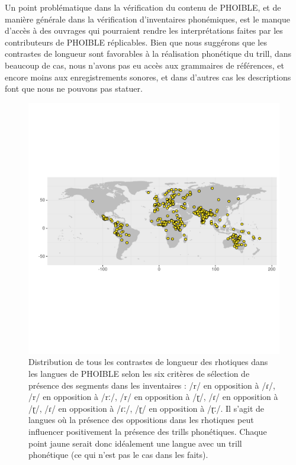 Un point problématique dans la vérification du contenu de PHOIBLE, et de manière générale dans la vérification d'inventaires phonémiques, est le manque d'accès à des ouvrages qui pourraient rendre les interprétations faites par les contributeurs de PHOIBLE réplicables. Bien que nous suggérons que les contrastes de longueur sont favorables à la réalisation phonétique du trill, dans beaucoup de cas, nous n'avons pas eu accès aux grammaires de références, et encore moins aux enregistrements sonores, et dans d'autres cas les descriptions font que nous ne pouvons pas statuer.\\

\begin{figure}
	\centering
	\includegraphics[width=1\linewidth,
	trim={0 5.65cm 0 5.25cm}, clip]{substance/images/contrast_lenght}
	\caption[Distribution de tous les contrastes de longueur des rhotiques dans les langues de PHOIBLE]{Distribution de tous les contrastes de longueur des rhotiques dans les langues de PHOIBLE selon les six critères de sélection de présence des segments dans les inventaires : /r/ en opposition à /ɾ/, /r/ en opposition à /rː/, /r/ en opposition à /ɽ/, /ɾ/ en opposition à /ɽ/, /ɾ/ en opposition à /ɾː/, /ɽ/ en opposition à /ɽː/. Il s'agit de langues où la présence des oppositions dans les rhotiques peut influencer positivement la présence des trills phonétiques. Chaque point jaune serait donc idéalement une langue avec un trill phonétique (ce qui n'est pas le cas dans les faits).}
	\label{fig:contrastlenght}
\end{figure}



